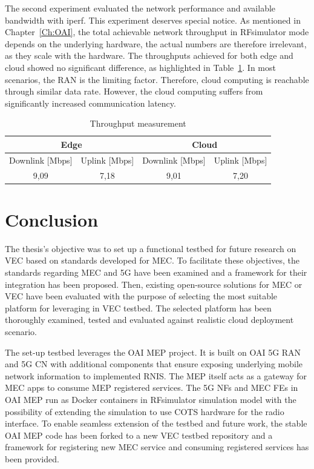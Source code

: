 \documentclass[12pt,a4paper,twoside]{report}
\begin{document}
The second experiment evaluated the network performance and available bandwidth with iperf. This experiment deserves special notice. As mentioned in Chapter~\ref{Ch:OAI}, the total achievable network throughput in RFsimulator mode depends on the underlying hardware, the actual numbers are therefore irrelevant, as they scale with the hardware. The throughputs achieved for both edge and cloud showed no significant difference, as highlighted in Table~\ref{T:throughput}. In most scenarios, the RAN is the limiting factor. Therefore, cloud computing is reachable through similar data rate. However, the cloud computing suffers from significantly increased communication latency.
\begin{table}[!ht]
    \centering
    \caption{Throughput measurement}
	\label{T:throughput}
    \begin{tabular}{|c|c|c|c|}
    \hline
        \multicolumn{2}{|c|}{Edge} & \multicolumn{2}{c|}{Cloud} \\ \hline
        Downlink [Mbps] & Uplink [Mbps] & Downlink [Mbps] & Uplink [Mbps] \\ \hline
        9,09 & 7,18 & 9,01 & 7,20 \\ \hline
    \end{tabular}
\end{table}
\chapter{Conclusion}
The thesis’s objective was to set up a functional testbed for future research on VEC based on standards developed for MEC. To facilitate these objectives, the standards regarding MEC and 5G have been examined and a framework for their integration has been proposed. Then, existing open-source solutions for MEC or VEC have been evaluated with the purpose of selecting the most suitable platform for leveraging in VEC testbed. The selected platform has been thoroughly examined, tested and evaluated against realistic cloud deployment scenario. 

The set-up testbed leverages the OAI MEP project. It is built on OAI 5G RAN and 5G CN with additional components that ensure exposing underlying mobile network information to implemented RNIS. The MEP itself acts as a gateway for MEC apps to consume MEP registered services. The 5G NFs and MEC FEs in OAI MEP run as Docker containers in RFsimulator simulation model with the possibility of extending the simulation to use COTS hardware for the radio interface. To enable seamless extension of the testbed and future work, the stable OAI MEP code has been forked to a new VEC testbed repository and a framework for registering new MEC service and consuming registered services has been provided. 
\end{document}
